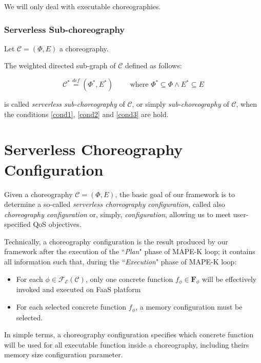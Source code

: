 \documentclass[12pt,a4paper]{report}
\newcommand{\mathDef}{\overset{\textit{def}}{=}}
\theoremstyle{definition}
\begin{document}
We will only deal with executable choreographies.

\subsubsection{Serverless Sub-choreography}

Let $\mathcal{C} = (\Phi,E)$ a choreography. 

The weighted directed sub-graph of $\mathcal{C}$ defined as follows:

\begin{equation}
	\mathcal{C}^* \mathDef (\Phi^*,E^*) \qquad \text{ where } \Phi^* \subseteq \Phi \wedge E^* \subseteq E
\end{equation}

is called \textit{serverless sub-choreography} of $\mathcal{C}$, or simply \textit{sub-choreography} of $\mathcal{C}$, when the conditions \ref{cond1}, \ref{cond2} and \ref{cond3} are hold.

\section{Serverless Choreography Configuration}

Given a choreography $\mathcal{C} = (\Phi,E)$, the basic goal of our framework is to determine a so-called \textit{serverless choreography configuration}, called also \textit{choreography configuration} or, simply, \textit{configuration}, allowing us to meet user-specified QoS objectives.

Technically, a choreography configuration is the result produced by our framework after the execution of the ``\textit{Plan}" phase of MAPE-K loop; it contains all information such that, during the ``\textit{Execution}" phase of MAPE-K loop:

\begin{itemize}
	\item For each $\phi \in \mathscr{F_E}(\mathcal{C})$, only one concrete function $f_{\phi} \in \textbf{F}_{\phi}$ will be effectively invoked and executed on FaaS platform 
	\item For each selected concrete function $f_{\phi}$, a memory configuration must be selected.
\end{itemize}

In simple terms, a choreography configuration specifies which concrete function will be used for all executable function inside a choreography, including theirs memory size configuration parameter.
\end{document}
